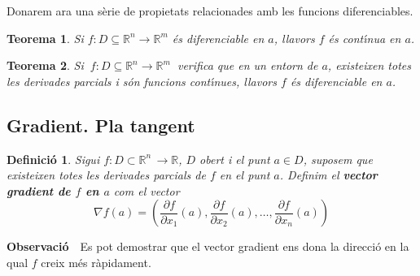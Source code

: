 \documentclass[12pt]{article}
\newcommand{\observacio}{\textbf{Observaci{\'o}}\ \ }
\newtheorem{definicio}{Definici{\'o}}[subsection]
\newtheorem{teorema}{Teorema}[subsection]
\newcommand{\R}{\mathbb{R}}
\begin{document}
\vspace{0.4cm}
Donarem ara una s{\`e}rie de propietats relacionades amb les funcions diferenciables.

\vspace{0.4cm}
\begin{teorema}
Si $f:D \subseteq\R^n \longrightarrow \R^m$ {\'e}s diferenciable en
$a$, llavors $f$ {\'e}s cont{\'\i}nua en $a$.
\end{teorema}


%
%



\vspace{0.4cm}
\begin{teorema}
Si $\ f:D \subseteq\R^n \longrightarrow \R^m\ $ verifica que en un entorn de $a$, existeixen totes les derivades parcials i s{\'o}n funcions cont{\'\i}nues,  llavors $f$  {\'e}s diferenciable en $a$.
\end{teorema}




\vspace{0.4cm}
\subsection{Gradient. Pla tangent}

\vspace{0.4cm}
\begin{definicio}
Sigui $f:D\subset\R^n\, \longrightarrow\R$, $D$ obert i el punt $a\in D$, suposem que existeixen totes les derivades
parcials de $f$ en el punt $a$. Definim el \textbf{vector
gradient de $f$ en $a$} com el vector
\[
\nabla f(a)=\left(\frac{\partial f}{\partial x_1}(a),\frac{\partial f}{\partial x_2}(a), \ldots , \frac{\partial f}{\partial x_n}(a)\right)
\]
\end{definicio}

\vspace{0.4cm}
\observacio Es pot demostrar que el vector gradient ens dona la direcci{\'o} en la qual $f$ creix m{\'e}s r{\`a}pidament.
\end{document}
